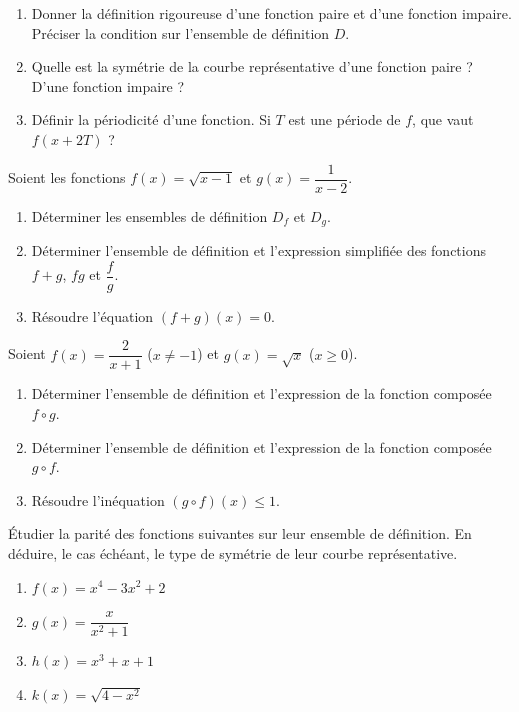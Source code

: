 \documentclass[11pt]{article}
\newcommand{\cle}[1]{{\popxbold\color{popdark}#1}}
\newcounter{popsec}
\newcounter{popsub}
\newcommand{\courssub}[1]{%
  \stepcounter{popsub}%
  \par\vspace{9pt}\noindent{\popxbold\fontsize{11.5}{13}\selectfont\color{popink}{\color{poporange}\thepopsec.\thepopsub}\hspace{6pt}#1}\par\nopagebreak\vspace{4pt}
}
\begin{document}
\begin{exercice}
\begin{enumerate}
    \item Donner la définition rigoureuse d'une fonction \cle{paire} et d'une fonction \cle{impaire}. Préciser la condition sur l'ensemble de définition $D$.
    \item Quelle est la symétrie de la courbe représentative d'une fonction paire ? D'une fonction impaire ?
    \item Définir la \cle{périodicité} d'une fonction. Si $T$ est une période de $f$, que vaut $f(x+2T)$ ?
\end{enumerate}
\end{exercice}

\courssub{Je m'entraîne}

\begin{exercice}
Soient les fonctions $f(x)=\sqrt{x-1}$ et $g(x)=\dfrac{1}{x-2}$.
\begin{enumerate}
    \item Déterminer les ensembles de définition $D_f$ et $D_g$.
    \item Déterminer l'ensemble de définition et l'expression simplifiée des fonctions $f+g$, $fg$ et $\dfrac{f}{g}$.
    \item Résoudre l'équation $(f+g)(x)=0$.
\end{enumerate}
\end{exercice}

\begin{exercice}
Soient $f(x)=\dfrac{2}{x+1}$ ($x \neq -1$) et $g(x)=\sqrt{x}$ ($x \geqslant 0$).
\begin{enumerate}
    \item Déterminer l'ensemble de définition et l'expression de la fonction composée $f \circ g$.
    \item Déterminer l'ensemble de définition et l'expression de la fonction composée $g \circ f$.
    \item Résoudre l'inéquation $(g \circ f)(x) \leqslant 1$.
\end{enumerate}
\end{exercice}

\begin{exercice}
Étudier la parité des fonctions suivantes sur leur ensemble de définition. En déduire, le cas échéant, le type de symétrie de leur courbe représentative.
\begin{enumerate}
    \item $f(x) = x^4 - 3x^2 + 2$
    \item $g(x) = \dfrac{x}{x^2+1}$
    \item $h(x) = x^3 + x + 1$
    \item $k(x) = \sqrt{4-x^2}$
\end{enumerate}
\end{exercice}
\end{document}
